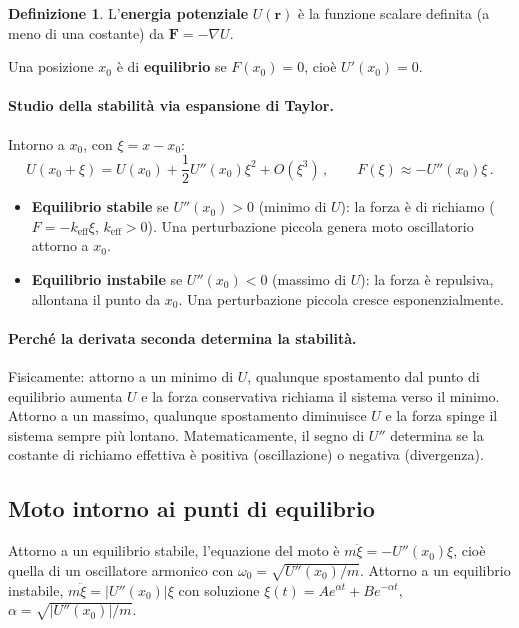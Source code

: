 \documentclass[11pt,a4paper]{article}
\renewcommand{\vec}[1]{\bm{#1}}
\theoremstyle{plain}
\theoremstyle{definition}
\newtheorem{definizione}{Definizione}[section]
\theoremstyle{remark}
\begin{document}
\begin{definizione}
L'\textbf{energia potenziale} $U(\vec{r})$ è la funzione scalare definita (a
meno di una costante) da $\vec{F}=-\nabla U$.
\end{definizione}

Una posizione $x_0$ è di \textbf{equilibrio} se $F(x_0)=0$, cioè
$U'(x_0)=0$.

\paragraph{Studio della stabilità via espansione di Taylor.}
Intorno a $x_0$, con $\xi=x-x_0$:
\[
  U(x_0+\xi)=U(x_0)+\frac{1}{2}U''(x_0)\xi^2+O(\xi^3)\,,\qquad
  F(\xi)\approx -U''(x_0)\xi\,.
\]

\begin{itemize}
  \item \textbf{Equilibrio stabile} se $U''(x_0)>0$ (minimo di $U$): la forza
    è di richiamo ($F=-k_\mathrm{eff}\xi$, $k_\mathrm{eff}>0$). Una perturbazione
    piccola genera moto oscillatorio attorno a $x_0$.
  \item \textbf{Equilibrio instabile} se $U''(x_0)<0$ (massimo di $U$): la forza
    è repulsiva, allontana il punto da $x_0$. Una perturbazione piccola cresce
    esponenzialmente.
\end{itemize}

\paragraph{Perché la derivata seconda determina la stabilità.}
Fisicamente: attorno a un minimo di $U$, qualunque spostamento dal punto di
equilibrio aumenta $U$ e la forza conservativa richiama il sistema verso il
minimo. Attorno a un massimo, qualunque spostamento diminuisce $U$ e la forza
spinge il sistema sempre più lontano. Matematicamente, il segno di $U''$
determina se la costante di richiamo effettiva è positiva (oscillazione) o
negativa (divergenza).

\subsection{Moto intorno ai punti di equilibrio}

Attorno a un equilibrio stabile, l'equazione del moto è
$m\ddot\xi=-U''(x_0)\xi$, cioè quella di un oscillatore armonico con
$\omega_0=\sqrt{U''(x_0)/m}$. Attorno a un equilibrio instabile,
$m\ddot\xi=|U''(x_0)|\xi$ con soluzione $\xi(t)=A e^{\alpha t}+Be^{-\alpha t}$,
$\alpha=\sqrt{|U''(x_0)|/m}$.
\end{document}
